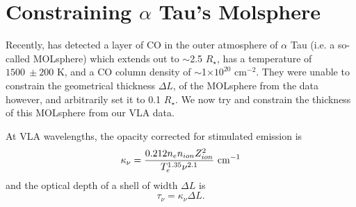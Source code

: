 \section{Constraining $\alpha$ Tau's Molsphere}\label{sec:6.5a}
Recently, \cite{ohnaka_2013} has detected a layer of CO in the outer atmosphere of $\alpha$ Tau (i.e. a so-called MOLsphere) which extends out to $\sim$2.5 $R_{\star}$, has a temperature of $1500 \ \pm 200$ K, and a CO column density of $\sim$1$\times 10^{20}$ cm$^{-2}$. They were unable to constrain the geometrical thickness $\Delta L$, of the MOLsphere from the data however, and arbitrarily set it to 0.1 $R_{\star}$. We now try and constrain the thickness of this MOLsphere from our VLA data.

At VLA wavelengths, the opacity corrected for stimulated emission is
\begin{equation}
\kappa _{\nu} =\frac{0.212n_{e}n_{ion}Z_{ion}^2}{T_{e}^{1.35}\nu ^{2.1}} \ \rm{cm}^{-1}
\label{eq:6.5.1}
\end{equation}
and the optical depth of a shell of width $\Delta L$ is
\begin{equation}
\tau _{\nu} =\kappa _{\nu}\Delta L.
\label{eq:6.5.2}
\end{equation}
